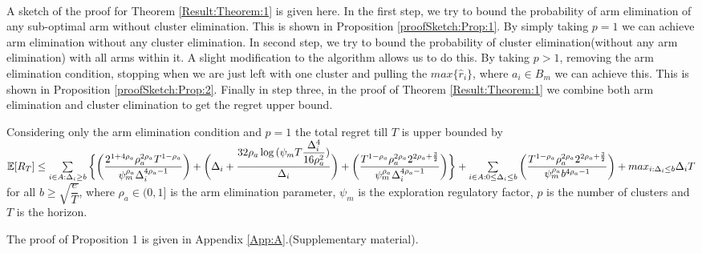 \paragraph*{}A sketch of the proof for Theorem \ref{Result:Theorem:1} is given here. In the first step, we try to bound the probability of arm elimination of any sub-optimal arm without cluster elimination. This is shown in Proposition \ref{proofSketch:Prop:1}. By simply taking $p=1$ we can achieve arm elimination without any cluster elimination. In second step, we try to bound the probability of cluster elimination(without any arm elimination) with all arms within it.  A slight modification to the algorithm allows us to do this. By taking $p>1$, removing the arm elimination condition, stopping when we are just left with one cluster and pulling the $max\lbrace \hat{r}_{i}\rbrace$, where $a_{i}\in B_{m}$ we can achieve this.  This is shown in Proposition \ref{proofSketch:Prop:2}. Finally in step three, in the proof of Theorem \ref{Result:Theorem:1} we combine both arm elimination and cluster elimination to get the regret upper bound.  
	

\begin{proposition}
\label{proofSketch:Prop:1}
Considering only the arm elimination condition and $p=1$ the total regret till $T$ is upper bounded by $\mathbb{E} [R_{T}]\leq \sum\limits_{i\in A:\Delta_{i}\geq b}\bigg\lbrace\bigg(\dfrac{2^{1+4\rho_{a}}\rho_{a}^{2\rho_{a}}T^{1-\rho_{a}}}{\psi_{m}^{\rho_{a}}\Delta_{i}^{4\rho_{a}-1}}\bigg) + \bigg(\Delta_{i}+\dfrac{32\rho_{a}\log{(\psi_{m}T\dfrac{\Delta_{i}^{4}}{16\rho_{a}^{2}})}}{\Delta_{i}}\bigg)  +  \bigg(\dfrac{T^{1-\rho_{a}}\rho_{a}^{2\rho_{a}}2^{2\rho_{a}+\frac{3}{2}}}{\psi_{m}^{\rho_{a}}\Delta_{i}^{4\rho_{a} -1}} \bigg) \bigg \rbrace+\sum\limits_{i\in A:0\leq\Delta_{i}\leq b}\bigg(\dfrac{T^{1-\rho_{a}}\rho_{a}^{2\rho_{a}}2^{2\rho_{a}+\frac{3}{2}}}{\psi_{m}^{\rho_{a}}b^{4\rho_{a} -1}} \bigg) + max_{i:\Delta_{i}\leq b}\Delta_{i}T$ for all $b\geq\sqrt{\dfrac{e}{T}}$, where $\rho_{a}\in (0,1]$ is the arm elimination parameter, $\psi_{m}$ is the exploration regulatory factor, $p$ is the number of clusters and $T$ is the horizon.
\end{proposition}


	The proof of Proposition 1 is given in Appendix \ref{App:A}.(Supplementary material).

